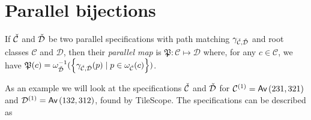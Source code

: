 \section{Parallel bijections}
\begin{definition}
If $\check{\mathcal{C}}$ and $\check{\mathcal{D}}$ be two parallel specifications with path matching $\gamma_{\check{\mathcal{C}},\check{\mathcal{D}}}$ and root classes $\mathcal{C}$ and $\mathcal{D}$, then their \emph{parallel map} is
$\mathfrak{P}: \mathcal{C} \mapsto \mathcal{D}$ where, for any $c \in \mathcal{C}$, we have
$\mathfrak{P}(c) = \omega_{\check{\mathcal{D}}}^{-1}(\left\{\gamma_{\check{\mathcal{C}},\check{\mathcal{D}}}(p) \mid p \in \omega_{\check{\mathcal{C}}}(c)\right\})$.
\end{definition}

As an example we will look at the specifications $\check{\mathcal{C}}$ and $\check{\mathcal{D}}$ for $\mathcal{C}^{(1)} = \textsf{Av}\left(231,321\right)$ and $\mathcal{D}^{(1)} = \textsf{Av}\left(132,312\right)$, found by TileScope. The specifications can be described as
